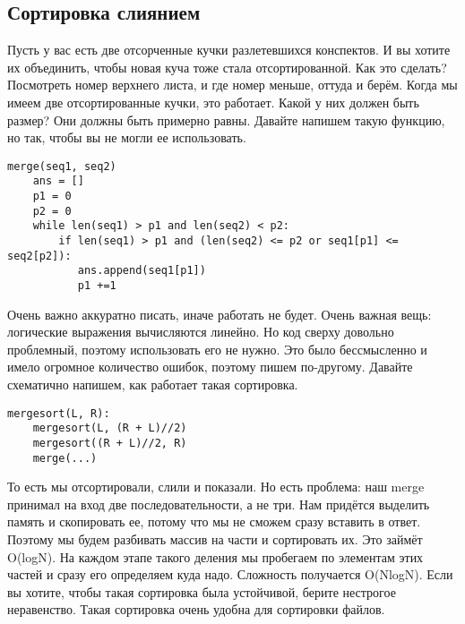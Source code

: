 \documentclass[a4paper,12pt]{article}
\begin{document}
\subsection{Сортировка слиянием}
Пусть у вас есть две отсорченные кучки разлетевшихся конспектов. И вы хотите их объединить, чтобы новая куча тоже стала отсортированной. Как это сделать? Посмотреть номер верхнего листа, и где номер меньше, оттуда и берём. Когда мы имеем две отсортированные кучки, это работает. Какой у них должен быть размер? Они должны быть примерно равны. Давайте напишем такую функцию, но так, чтобы вы не могли ее использовать. 
\begin{verbatim}
merge(seq1, seq2)
    ans = []
    p1 = 0
    p2 = 0
    while len(seq1) > p1 and len(seq2) < p2:
        if len(seq1) > p1 and (len(seq2) <= p2 or seq1[p1] <= seq2[p2]):
           ans.append(seq1[p1])
           p1 +=1
\end{verbatim}
Очень важно аккуратно писать, иначе работать не будет. Очень важная вещь: логические выражения вычисляются линейно. Но код сверху довольно проблемный, поэтому использовать его не нужно. Это было бессмысленно и имело огромное количество ошибок, поэтому пишем по-другому. Давайте схематично напишем, как работает такая сортировка.
\begin{verbatim}
mergesort(L, R):
    mergesort(L, (R + L)//2)
    mergesort((R + L)//2, R)
    merge(...)
\end{verbatim}
То есть мы отсортировали, слили и показали. Но есть проблема: наш merge принимал на вход две последовательности, а не три. Нам придётся выделить память и скопировать ее, потому что мы не сможем сразу вставить в ответ. Поэтому мы будем разбивать массив на части и сортировать их. Это займёт O(logN). На каждом этапе такого деления мы пробегаем по элементам этих частей и сразу его определяем куда надо. Сложность получается O(NlogN). Если вы хотите, чтобы такая сортировка была устойчивой, берите нестрогое неравенство. Такая сортировка очень удобна для сортировки файлов.
\end{document}
